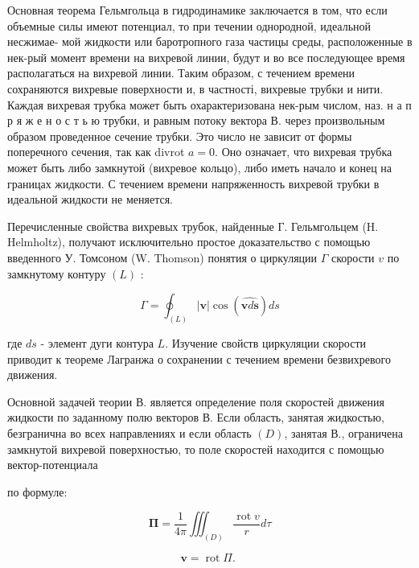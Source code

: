 \documentclass[10pt]{article}
\begin{document}
Основная теорема Гельмгольца в гидродинамике заключается в том, что если объемные силы имеют потенциал, то при течении однородной, идеальной несжимае- мой жидкости или баротропного газа частицы среды, расположенные в нек-рый момент времени на вихревой линии, будут и во все последующее время располагаться на вихревой линии. Таким образом, с течением времени сохраняются вихревые поверхности и, в частності, вихревые трубки и нити. Каждая вихревая трубка может быть охарактеризована нек-рым числом, наз. н а п р я ж е н о с т ь ю трубки, и равным потоку вектора В. через произвольным образом проведенное сечение трубки. Это число не зависит от формы поперечного сечения, так как divrot $a=0$. Оно означает, что вихревая трубка может быть либо замкнутой (вихревое кольцо), либо иметь начало и конец на границах жидкости. С течением времени напряженность вихревой трубки в идеальной жидкости не меняется.



Перечисленные свойства вихревых трубок, найденные Г. Гельмгольцем (H. Helmholtz), получают исключительно простое доказательство с помощью введенного У. Томсоном (W. Thomson) понятия о циркуляции $\Gamma$ скорости $v$ по замкнутому контуру $(L)$ :



\[

\Gamma=\oint_{(L)}|\boldsymbol{v}| \cos (\widehat{\boldsymbol{v} d \boldsymbol{s}}) d s

\]



где $d s$ - элемент дуги контура $L$. Изучение свойств циркуляции скорости приводит к теореме Лагранжа о сохранении с течением времени безвихревого движения.



Основной задачей теории В. является определение поля скоростей движения жидкости по заданному полю векторов В. Если область, занятая жидкостью, безгранична во всех направлениях и если область $(D)$, занятая В., ограничена замкнутой вихревой поверхностью, то поле скоростей находится с помощью вектор-потенциала



по формуле:



\[

\boldsymbol{\Pi}=\frac{1}{4 \pi} \iiint_{(D)} \frac{\operatorname{rot} v}{r} d \tau

\]



\[

\boldsymbol{v}=\operatorname{rot} \Pi \text {. }

\]
\end{document}
